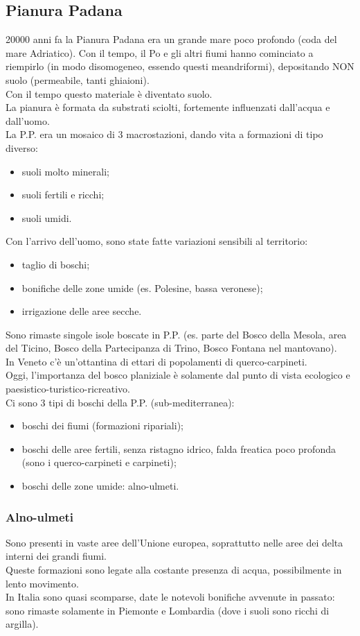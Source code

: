 \subsection{Pianura Padana}
20000 anni fa la Pianura Padana era un grande mare poco profondo (coda del mare Adriatico). Con il tempo, il Po e gli altri fiumi hanno cominciato a riempirlo (in modo disomogeneo, essendo questi meandriformi), depositando NON suolo (permeabile, tanti ghiaioni).\\
Con il tempo questo materiale è diventato suolo.\\
La pianura è formata da substrati sciolti, fortemente influenzati dall'acqua e dall'uomo.\\
La P.P. era un mosaico di 3 macrostazioni, dando vita a formazioni di tipo diverso: 
\begin{itemize}[nosep]
    \item suoli molto minerali;
    \item suoli fertili e ricchi;
    \item suoli umidi.
\end{itemize}
Con l'arrivo dell'uomo, sono state fatte variazioni sensibili al territorio:
\begin{itemize}[nosep]
    \item taglio di boschi;
    \item bonifiche delle zone umide (es. Polesine, bassa veronese);
    \item irrigazione delle aree secche.
\end{itemize}
Sono rimaste singole isole boscate in P.P. (es. parte del Bosco della Mesola, area del Ticino, Bosco della Partecipanza di Trino, Bosco Fontana nel mantovano).\\
In Veneto c'è un'ottantina di ettari di popolamenti di querco-carpineti.\\
Oggi, l'importanza del bosco planiziale è solamente dal punto di vista ecologico e paesistico-turistico-ricreativo.\\
Ci sono 3 tipi di boschi della P.P. (sub-mediterranea):
\begin{itemize}[nosep]
    \item boschi dei fiumi (formazioni ripariali);
    \item boschi delle aree fertili, senza ristagno idrico, falda freatica poco profonda (sono i querco-carpineti e carpineti);
    \item boschi delle zone umide: alno-ulmeti.
\end{itemize}
\subsubsection{Alno-ulmeti}
Sono presenti in vaste aree dell'Unione europea, soprattutto nelle aree dei delta interni dei grandi fiumi.\\
Queste formazioni sono legate alla costante presenza di acqua, possibilmente in lento movimento.\\
In Italia sono quasi scomparse, date le notevoli bonifiche avvenute in passato: sono rimaste solamente in Piemonte e Lombardia (dove i suoli sono ricchi di argilla).

